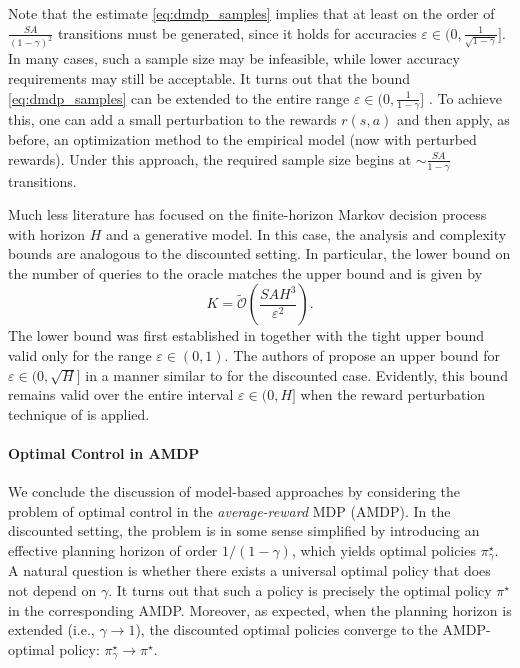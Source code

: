 \documentclass{article}
\numberwithin{equation}{section}
\begin{document}
Note that the estimate \eqref{eq:dmdp_samples} implies that at least on the order of $\tfrac{S A}{(1-\gamma)^2}$ transitions must be generated, since it holds for accuracies $\varepsilon \in \bigl(0, \tfrac{1}{\sqrt{1-\gamma}}\bigr]$. In many cases, such a sample size may be infeasible, while lower accuracy requirements may still be acceptable.  It turns out that the bound \eqref{eq:dmdp_samples} can be extended to the entire range $\varepsilon \in \bigl(0,\tfrac{1}{1-\gamma}\bigr]$ \cite{li2020breaking}. To achieve this, one can add a small perturbation to the rewards $r(s,a)$ and then apply, as before, an optimization method to the empirical model (now with perturbed rewards). Under this approach, the required sample size begins at $\sim \tfrac{S A}{1-\gamma}$ transitions.

Much less literature has focused on the finite-horizon Markov decision process with horizon $H$ and a generative model. In this case, the analysis and complexity bounds are analogous to the discounted setting.
In particular, the lower bound on the number of queries to the oracle matches the upper bound and is given by
\begin{equation*}
    K=\widetilde{\mathcal{O}}\left(\frac{S A H^3}{\varepsilon^2}\right).
\end{equation*}
The lower bound was first established in \cite{sidford2018near} together with the tight upper bound valid only for the range \(\varepsilon\in (0,1)\). The authors of \cite{agarwal2019reinforcement} propose an upper bound for $\varepsilon\in(0,\sqrt{H}]$ in a manner similar to \cite{gheshlaghi2013minimax} for the discounted case. Evidently, this bound remains valid over the entire interval $\varepsilon\in(0,H]$ when the reward perturbation technique of \citet{li2020breaking} is applied.

\paragraph{Optimal Control in AMDP} 
We conclude the discussion of model-based approaches by considering the problem of optimal control in the \emph{average-reward} MDP (AMDP). 
In the discounted setting, the problem is in some sense simplified by introducing an effective planning horizon of order $1/(1-\gamma)$, which yields optimal policies $\pi_\gamma^\star$. A natural question is whether there exists a universal optimal policy that does not depend on $\gamma$. It turns out that such a policy is precisely the optimal policy $\pi^\star$ in the corresponding AMDP. Moreover, as expected, when the planning horizon is extended (i.e., $\gamma \to 1$), the discounted optimal policies converge to the AMDP-optimal policy: $\pi^\star_\gamma \to \pi^\star$. 
\end{document}
